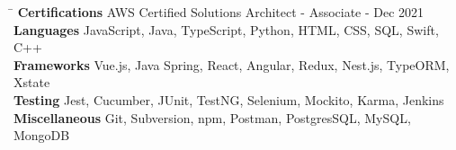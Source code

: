 \documentclass[11pt]{article}
\begin{document}
\begin{raggedright}
	\begin{tabbing}
		\hspace*{4cm}\= \kill
		\textbf{Certifications} \> AWS Certified Solutions Architect - Associate - Dec 2021 \\
		\textbf{Languages}  \> JavaScript, Java, TypeScript, Python, HTML, CSS, SQL, Swift, C++ \\
		\textbf{Frameworks} \> Vue.js, Java Spring, React, Angular, Redux, Nest.js, TypeORM, Xstate \\
		\textbf{Testing} \> Jest, Cucumber, JUnit, TestNG, Selenium, Mockito, Karma, Jenkins \\
		\textbf{Miscellaneous} \> Git, Subversion, npm, Postman, PostgresSQL, MySQL, MongoDB \\
	\end{tabbing}
		
\end{raggedright}	
\end{document}
